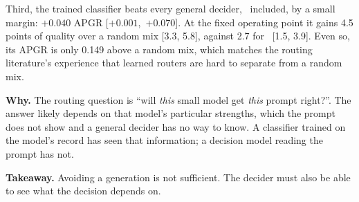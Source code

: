 Third, the trained classifier beats every general decider, \jev\ included, by a small margin: $+0.040$ APGR [$+0.001$,~$+0.070$].
At the fixed operating point it gains 4.5 points of quality over a random mix [3.3, 5.8], against 2.7 for \jev\ [1.5, 3.9].
Even so, its APGR is only 0.149 above a random mix, which matches the routing literature's experience that learned routers are hard to separate from a random mix.

\textbf{Why.} The routing question is ``will \emph{this} small model get \emph{this} prompt right?''.
The answer likely depends on that model's particular strengths, which the prompt does not show and a general decider has no way to know.
A classifier trained on the model's record has seen that information; a decision model reading the prompt has not.

\textbf{Takeaway.} Avoiding a generation is not sufficient. The decider must also be able to see what the decision depends on.
